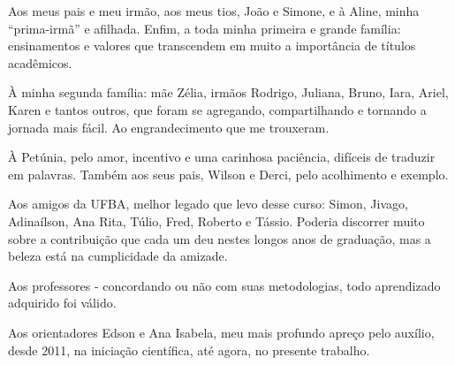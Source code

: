 \begin{agradecimentos}
	
	Aos meus pais e meu irmão, aos meus tios, João e Simone, e à Aline, minha ``prima-irmã'' e afilhada. Enfim, a toda minha primeira e grande família: ensinamentos e valores que transcendem em muito a importância de títulos acadêmicos.
	
	À minha segunda família: mãe Zélia, irmãos Rodrigo, Juliana, Bruno, Iara, Ariel, Karen e tantos outros, que foram se agregando, compartilhando e tornando a jornada mais fácil. Ao engrandecimento que me trouxeram.
	
	À Petúnia, pelo amor, incentivo e uma carinhosa paciência, difíceis de traduzir em palavras. Também aos seus pais, Wilson e Derci, pelo acolhimento e exemplo.
	
	Aos amigos da UFBA, melhor legado que levo desse curso: Simon, Jivago, Adinaílson, Ana Rita, Túlio, Fred, Roberto e Tássio. Poderia discorrer muito sobre a contribuição que cada um deu nestes longos anos de graduação, mas a beleza está na cumplicidade da amizade.
	
	Aos professores - concordando ou não com suas metodologias, todo aprendizado adquirido foi válido.
	
	Aos orientadores Edson e Ana Isabela, meu mais profundo apreço pelo auxílio, desde 2011, na iniciação científica, até agora, no presente trabalho.
	
\end{agradecimentos}